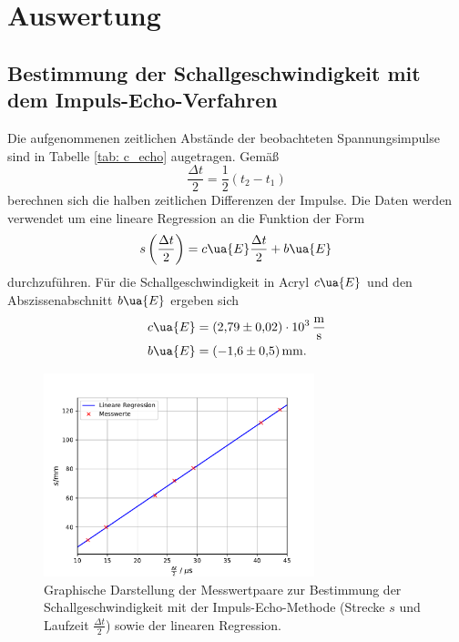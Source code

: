 \section{Auswertung}

\subsection{Bestimmung der Schallgeschwindigkeit mit dem Impuls-Echo-Verfahren}
Die aufgenommenen zeitlichen Abstände der beobachteten Spannungsimpulse sind in Tabelle \ref{tab: c_echo}
augetragen. Gemäß
\begin{equation}
  \frac{\Delta t}{2} = \frac{1}{2}\left(t_2 - t_1\right)
\end{equation}
berechnen sich die halben zeitlichen Differenzen der Impulse. Die Daten werden verwendet um eine
lineare Regression an die Funktion der Form
\begin{equation}
  s \left(\frac{\Delta t}{2}\right) = c\ua{E} \frac{\Delta t}{2} + b\ua{E}
\end{equation}
durchzuführen. Für die Schallgeschwindigkeit in Acryl $c\ua{E}$ und den Abszissenabschnitt $b\ua{E}$
ergeben sich
\begin{align}
  \begin{aligned}
    c\ua{E} &= \SI{+2.79(2)e+03}{\meter\per\second} \\
    b\ua{E} &= \SI{-1.6(5)}{\milli\meter}.
    \label{eq: params_echo}
  \end{aligned}
\end{align}

\begin{figure}[H]
  \centering
  \includegraphics[width = 0.7\textwidth]{../Messdaten/plots/schallgeschwindigkeit.pdf}
  \caption{Graphische Darstellung der Messwertpaare zur Bestimmung der Schallgeschwindigkeit
  mit der Impuls-Echo-Methode (Strecke $s$ und Laufzeit $\frac{\Delta t}{2}$) sowie der linearen Regression.}
  \label{fig: c_echo}
\end{figure}


